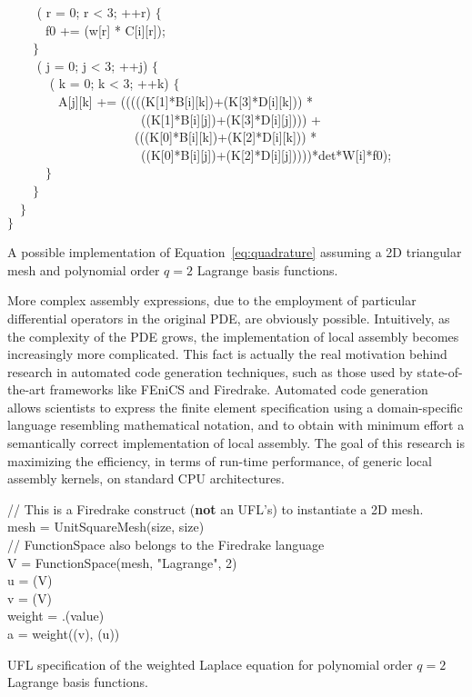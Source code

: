 \begin{algorithm}[t]
~~~~ ( r  = 0; r < 3; ++r) $\lbrace$ \\
~~~~~~f0 += (w[r] * C[i][r]);\\
~~~~$\rbrace$ \\
~~~~ ( j = 0; j < 3; ++j) $\lbrace$\\
~~~~~~ ( k = 0; k < 3; ++k) $\lbrace$\\
~~~~~~~~A[j][k] += (((((K[1]*B[i][k])+(K[3]*D[i][k])) * \\
~~~~~~~~~~~~~~~~~~~~~((K[1]*B[i][j])+(K[3]*D[i][j]))) + \\
~~~~~~~~~~~~~~~~~~~~(((K[0]*B[i][k])+(K[2]*D[i][k])) * \\
~~~~~~~~~~~~~~~~~~~~~((K[0]*B[i][j])+(K[2]*D[i][j]))))*det*W[i]*f0);\\
~~~~~~$\rbrace$\\
~~~~$\rbrace$\\
~~$\rbrace$\\
$\rbrace$
\caption{A possible implementation of Equation~\ref{eq:quadrature} assuming a 2D triangular mesh and polynomial order $q=2$ Lagrange basis functions.}
\label{code:weighted-laplace}
\end{algorithm}

More complex assembly expressions, due to the employment of particular differential operators in the original PDE, are obviously possible. Intuitively, as the complexity of the PDE grows, the implementation of local assembly becomes increasingly more complicated. This fact is actually the real motivation behind research in automated code generation techniques, such as those used by state-of-the-art frameworks like FEniCS and Firedrake. Automated code generation allows scientists to express the finite element specification using a domain-specific language resembling mathematical notation, and to obtain with minimum effort a semantically correct implementation of local assembly. The goal of this research is maximizing the efficiency, in terms of run-time performance, of generic local assembly kernels, on standard CPU architectures. 

\begin{algorithm}[t]
\scriptsize
{}

// This is a Firedrake construct (\textbf{not} an UFL's) to instantiate a 2D mesh.\\
mesh = UnitSquareMesh(size, size)\\
// FunctionSpace also belongs to the Firedrake language \\
V = FunctionSpace(mesh, "Lagrange", 2)\\
u = (V)\\
v = (V)\\
weight = .(value)\\
a = weight\KwSty{*}((v), (u))
\caption{UFL specification of the weighted Laplace equation for polynomial order $q=2$ Lagrange basis functions.}
\label{code:weighted-laplace-ufl}
\end{algorithm}

